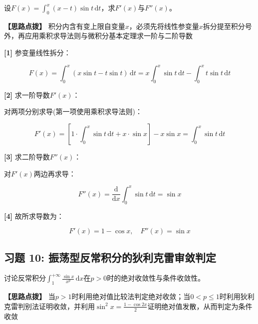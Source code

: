 \documentclass[11pt,a4paper,UTF8]{ctexart}
\begin{document}
设$F(x) = \int_0^x (x - t)\sin t\,\mathrm{d}t$，求$F'(x)$与$F''(x)$。

\textbf{\color{DeepPurple}【思路点拨】} 积分内含有变上限自变量$x$，必须先将线性参变量$x$拆分提至积分号外，再应用乘积求导法则与微积分基本定理求一阶与二阶导数


\begin{solbox}[分步推导与答题规范]
\textbf{[1]} 参变量线性拆分：


\begin{equation*}
F(x) = \int_0^x (x\sin t - t\sin t)\,\mathrm{d}t = x \int_0^x \sin t\,\mathrm{d}t - \int_0^x t\sin t\,\mathrm{d}t
\end{equation*}


\textbf{[2]} 求一阶导数$F'(x)$：

对两项分别求导(第一项使用乘积求导法则)：


\begin{equation*}
F'(x) = \left[ 1 \cdot \int_0^x \sin t\,\mathrm{d}t + x \cdot \sin x \right] - x\sin x = \int_0^x \sin t\,\mathrm{d}t
\end{equation*}


\textbf{[3]} 求二阶导数$F''(x)$：

对$F'(x)$两边再求导：


\begin{equation*}
F''(x) = \frac{\mathrm{d}}{\mathrm{d}x} \int_0^x \sin t\,\mathrm{d}t = \sin x
\end{equation*}


\textbf{[4]} 故所求导数为：


\begin{equation*}
F'(x) = 1 - \cos x, \quad F''(x) = \sin x
\end{equation*}

\end{solbox}


\subsection{习题 10: 振荡型反常积分的狄利克雷审敛判定}

讨论反常积分$\int_1^{+\infty} \frac{\sin x}{x^p}\,\mathrm{d}x$在$p > 0$时的绝对收敛性与条件收敛性。

\textbf{\color{DeepPurple}【思路点拨】} 当$p>1$时利用绝对值比较法判定绝对收敛；当$0<p\le 1$时利用狄利克雷判别法证明收敛，并利用$\sin^2 x = \frac{1-\cos 2x}{2}$证明绝对值发散，从而判定为条件收敛
\end{document}
